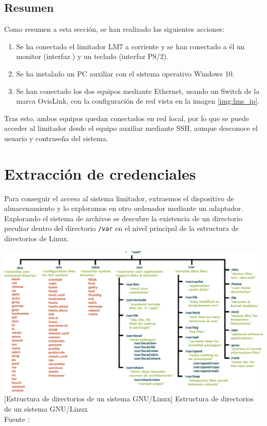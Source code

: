 \subsection{Resumen} \label{cap1:sec1:resumen}

Como resumen a esta sección, se han realizado las siguientes acciones:

\begin{enumerate}
\item Se ha conectado el limitador LM7 a corriente y se han conectado a él un monitor (interfaz ) y un teclado (interfaz PS/2).

\item Se ha instalado un \acrshort{PC} auxiliar con el sistema operativo Windows 10.

\item Se han conectado los dos equipos mediante Ethernet, usando un Switch de la marca OvisLink, con la configuración de red vista en la imagen \ref{img:lms_ip}.
\end{enumerate}

Tras esto, ambos equipos quedan conectados en red local, por lo que se puede acceder al limitador desde el equipo auxiliar mediante \acrshort{SSH}, aunque desconoce el usuario y contraseña del sistema.

\section{Extracción de credenciales} \label{lm7-credenciales}

Para conseguir el acceso al sistema limitador, extraemos el dispositivo de almacenamiento y lo exploramos en otro ordenador mediante un adaptador. Explorando el sistema de archivos se descubre la existencia de un directorio peculiar dentro del directorio \texttt{/var} en el nivel principal de la estructura de directorios de Linux.

\begin{center}
    \includegraphics[scale=0.5]{figuras/unix_filesystem_hierarchy.pdf}
    [Estructura de directorios de un sistema GNU/Linux]
    {
        Estructura de directorios de un sistema \gls{GNU/Linux} \\
        Fuente : \cite{wikipedia}
    }
    \label{fig:dirs_linux}
\end{center}

